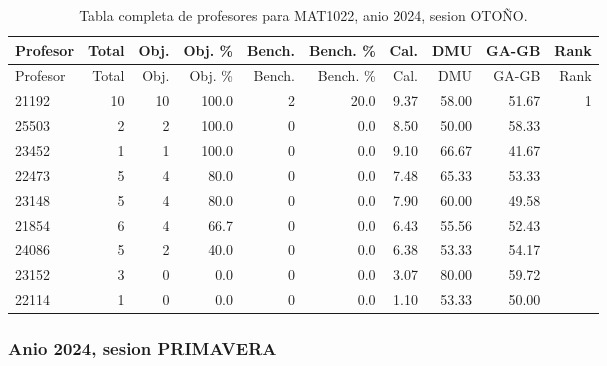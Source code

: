 \begingroup
\scriptsize
\setlength{\tabcolsep}{3pt}
\begin{longtable}{lrrrrrrrrr}
\caption{Tabla completa de profesores para MAT1022, anio 2024, sesion OTOÑO.}\label{tab:prof-period-mat1022-2024-oto-o}\\
\toprule
Profesor & Total & Obj. & Obj. \% & Bench. & Bench. \% & Cal. & DMU & GA-GB & Rank \\
\midrule
\endfirsthead
\toprule
Profesor & Total & Obj. & Obj. \% & Bench. & Bench. \% & Cal. & DMU & GA-GB & Rank \\
\midrule
\endhead
21192 & 10 & 10 & 100.0 & 2 & 20.0 & 9.37 & 58.00 & 51.67 & 1 \\
25503 & 2 & 2 & 100.0 & 0 & 0.0 & 8.50 & 50.00 & 58.33 &  \\
23452 & 1 & 1 & 100.0 & 0 & 0.0 & 9.10 & 66.67 & 41.67 &  \\
22473 & 5 & 4 & 80.0 & 0 & 0.0 & 7.48 & 65.33 & 53.33 &  \\
23148 & 5 & 4 & 80.0 & 0 & 0.0 & 7.90 & 60.00 & 49.58 &  \\
21854 & 6 & 4 & 66.7 & 0 & 0.0 & 6.43 & 55.56 & 52.43 &  \\
24086 & 5 & 2 & 40.0 & 0 & 0.0 & 6.38 & 53.33 & 54.17 &  \\
23152 & 3 & 0 & 0.0 & 0 & 0.0 & 3.07 & 80.00 & 59.72 &  \\
22114 & 1 & 0 & 0.0 & 0 & 0.0 & 1.10 & 53.33 & 50.00 &  \\
\bottomrule
\end{longtable}
\endgroup

\subsubsection{Anio 2024, sesion PRIMAVERA}


